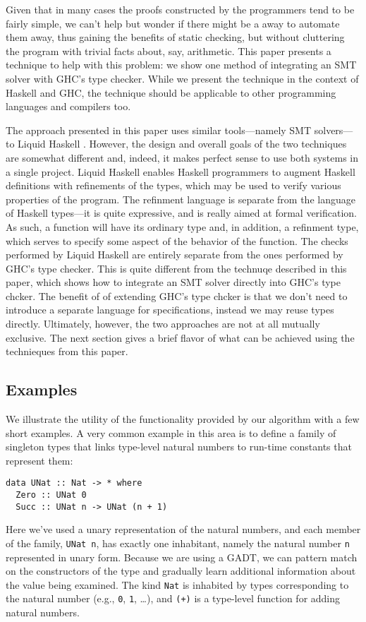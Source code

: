 \documentclass{sigplanconf}
\begin{document}
Given that in many cases the proofs constructed by the programmers
tend to be fairly simple, we can't help but wonder if there might
be a away to automate them away, thus gaining the benefits of
static checking, but without cluttering the program with trivial
facts about, say, arithmetic.  This paper presents a technique
to help with this problem: we show one method of integrating
an SMT solver with GHC's type checker.  While we present
the technique in the context of Haskell and GHC, the technique
should be applicable to other programming languages and compilers too.

The approach presented in this paper uses similar tools---namely
SMT solvers---to Liquid Haskell \cite{liquid-haskell}. However,
the design and overall goals of the two techniques are somewhat
different and, indeed, it makes perfect sense to use both systems
in a single project.  Liquid Haskell enables Haskell programmers
to augment Haskell definitions with refinements of the types,
which may be used to verify various properties of the program.
The refinment language is separate from the language of Haskell
types---it is quite expressive, and is really aimed at formal
verification.  As such, a function will have its ordinary
type and, in addition, a refinment type, which serves to specify
some aspect of the behavior of the function.  The checks performed
by Liquid Haskell are entirely separate from the ones performed
by GHC's type checker.  This is quite different from the
technuqe described in this paper, which shows how to integrate
an SMT solver directly into GHC's type chcker.  The benefit of
of extending GHC's type chcker is that we don't need to
introduce a separate language for specifications, instead
we may reuse types directly.  Ultimately, however, the two
approaches are not at all mutually exclusive.  The next
section gives a brief flavor of what can be achieved using
the technieques from this paper.

\subsection{Examples}

We illustrate the utility of the functionality provided by our
algorithm with a few short examples.  A very common example in
this area is to define a family of singleton types that links
type-level natural numbers to run-time constants that represent
them:
\begin{Verbatim}
data UNat :: Nat -> * where
  Zero :: UNat 0
  Succ :: UNat n -> UNat (n + 1)
\end{Verbatim}
Here we've used a unary representation of the natural numbers,
and each member of the family, \Verb"UNat n", has exactly one
inhabitant, namely the natural number \Verb"n" represented in
unary form.  Because we are using a GADT, we can pattern match
on the constructors of the type and gradually learn additional
information about the value being examined.  The kind \Verb"Nat"
is inhabited by types corresponding to the natural number
(e.g., \Verb"0", \Verb"1", \dots), and \Verb"(+)" is a type-level
function for adding natural numbers.
\end{document}
